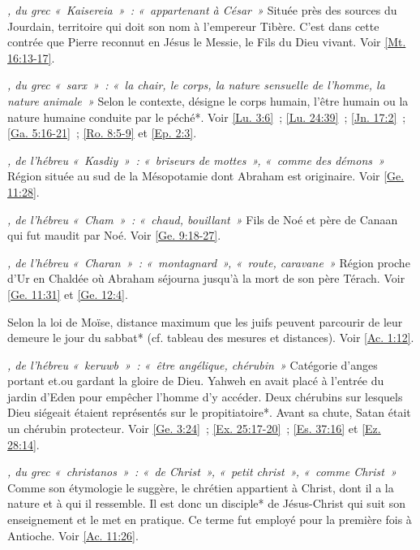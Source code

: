 \begin{multicols}{2}
\textit{, du grec «~Kaisereia~»~: «~appartenant à César~»}\newline
Située près des sources du Jourdain, territoire qui doit son nom à l'empereur Tibère. C'est dans cette contrée que Pierre reconnut en Jésus le Messie, le Fils du Dieu vivant. Voir \vref{Mt. 16:13-17}.

\textit{, du grec «~sarx~»~: «~la chair, le corps, la nature sensuelle de l'homme, la nature animale~»}\newline
Selon le contexte, désigne le corps humain, l'être humain ou la nature humaine conduite par le péché*. Voir \vref{Lu. 3:6}~; \vref{Lu. 24:39}~; \vref{Jn. 17:2}~; \vref{Ga. 5:16-21}~; \vref{Ro. 8:5-9} et \vref{Ep. 2:3}.

\textit{, de l'hébreu «~Kasdiy~»~: «~briseurs de mottes~», «~comme des démons~»}\newline
Région située au sud de la Mésopotamie dont Abraham est originaire. Voir \vref{Ge. 11:28}.

\textit{, de l'hébreu «~Cham~»~: «~chaud, bouillant~»}\newline
Fils de Noé et père de Canaan qui fut maudit par Noé. Voir \vref{Ge. 9:18-27}.

\textit{, de l'hébreu «~Charan~»~: «~montagnard~», «~route, caravane~»}\newline
Région proche d'Ur en Chaldée où Abraham séjourna jusqu'à la mort de son père Térach. Voir \vref{Ge. 11:31} et \vref{Ge. 12:4}.

\textit{}\newline
Selon la loi de Moïse, distance maximum que les juifs peuvent parcourir de leur demeure le jour du sabbat* (cf. tableau des mesures et distances). Voir \vref{Ac. 1:12}.

\textit{, de l'hébreu «~keruwb~»~: «~être angélique, chérubin~»}\newline
Catégorie d'anges portant et.ou gardant la gloire de Dieu. Yahweh en avait placé à l'entrée du jardin d'Eden pour empêcher l'homme d'y accéder. Deux chérubins sur lesquels Dieu siégeait étaient représentés sur le propitiatoire*. Avant sa chute, Satan était un chérubin protecteur. Voir \vref{Ge. 3:24}~; \vref{Ex. 25:17-20}~; \vref{Es. 37:16} et \vref{Ez. 28:14}.

\textit{, du grec «~christanos~»~: «~de Christ~», «~petit christ~», «~comme Christ~»}\newline
Comme son étymologie le suggère, le chrétien appartient à Christ, dont il a la nature et à qui il ressemble. Il est donc un disciple* de Jésus-Christ qui suit son enseignement et le met en pratique. Ce terme fut employé pour la première fois à Antioche. Voir \vref{Ac. 11:26}.


\end{multicols}
